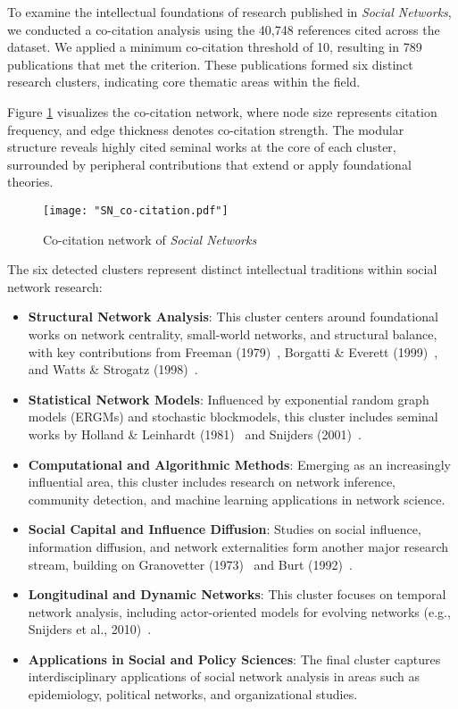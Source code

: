 \documentclass[twocolumn]{article}
\begin{document}
	To examine the intellectual foundations of research published in \textit{Social Networks}, we conducted a co-citation analysis using the 40,748 references cited across the dataset. We applied a minimum co-citation threshold of 10, resulting in 789 publications that met the criterion. These publications formed six distinct research clusters, indicating core thematic areas within the field.
	
	Figure \ref{fig.fig8} visualizes the co-citation network, where node size represents citation frequency, and edge thickness denotes co-citation strength. The modular structure reveals highly cited seminal works at the core of each cluster, surrounded by peripheral contributions that extend or apply foundational theories. 
	
	\begin{figure}[htbp]
		\centering
		\texttt{[image: "SN\_co-citation.pdf"]}
		\caption{Co-citation network of \textit{Social Networks}}
		\label{fig.fig8}
	\end{figure}
	
	The six detected clusters represent distinct intellectual traditions within social network research:
	
	\begin{itemize}
		\item \textbf{Structural Network Analysis}: This cluster centers around foundational works on network centrality, small-world networks, and structural balance, with key contributions from Freeman (1979)~\cite{Freeman1979}, Borgatti \& Everett (1999)~\cite{borgatti1999core}, and Watts \& Strogatz (1998)~\cite{Watts1998}.
		\item \textbf{Statistical Network Models}: Influenced by exponential random graph models (ERGMs) and stochastic blockmodels, this cluster includes seminal works by Holland \& Leinhardt (1981)~\cite{holland1981exponential} and Snijders (2001)~\cite{snijders2001statistical}.
		\item \textbf{Computational and Algorithmic Methods}: Emerging as an increasingly influential area, this cluster includes research on network inference, community detection, and machine learning applications in network science.
		\item \textbf{Social Capital and Influence Diffusion}: Studies on social influence, information diffusion, and network externalities form another major research stream, building on Granovetter (1973)~\cite{granovetter1973strength} and Burt (1992)~\cite{Burt1992}.
		\item \textbf{Longitudinal and Dynamic Networks}: This cluster focuses on temporal network analysis, including actor-oriented models for evolving networks (e.g., Snijders et al., 2010)~\cite{snijders2010stochastic}.
		\item \textbf{Applications in Social and Policy Sciences}: The final cluster captures interdisciplinary applications of social network analysis in areas such as epidemiology, political networks, and organizational studies.
	\end{itemize}
	
\end{document}
